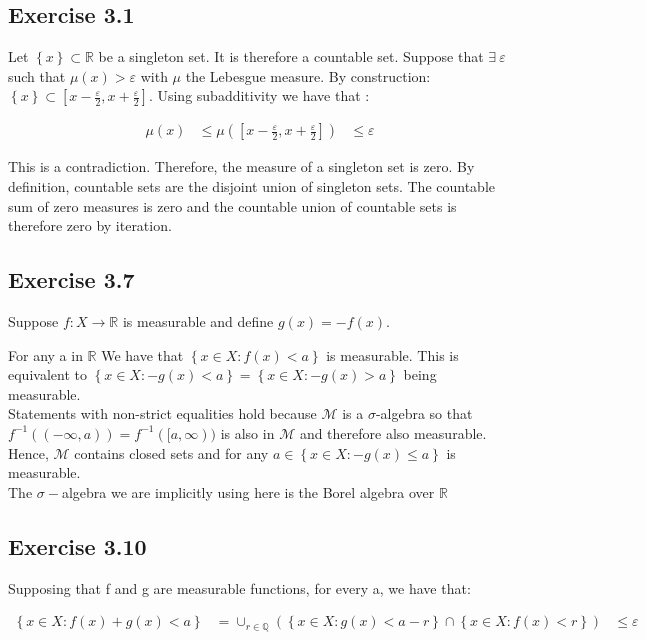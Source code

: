 \documentclass[11pt]{article}
\numberwithin{equation}{section}
\theoremstyle{plain}
\theoremstyle{definition}
\newcommand\parens[1]{\left( #1 \right)}
\newcommand\squares[1]{\left[ #1 \right]}
\newcommand\braces[1]{\left\{ #1 \right\}}
\def\ss{\subset}
\newcommand{\1}{\mathbbm 1}
\def\s{\sigma}
\newcommand{\e}{\varepsilon}
\newcommand{\RR}{\mathbb R}
\newcommand{\QQ}{\mathbb Q}
\newcommand{\mM}{\mathcal M}
\begin{document}
\subsection*{Exercise 3.1}
Let $\braces{x} \ss \RR$  be a singleton set. It is therefore a countable set. Suppose that $\exists \ \e$ such that $\mu (x) > \e $ with $\mu$ the Lebesgue measure. 
By construction:
$\braces{x} \ss \squares{x - \frac{\e}{2}, x + \frac{\e}{2}}$. Using subadditivity we have that :

\begin{align}
\mu (x) &\leq \mu \parens{\squares{x - \frac{\e}{2}, x + \frac{\e}{2}}}
		& \leq \e
\end{align}

This is a contradiction. Therefore, the measure of a singleton set is zero. By definition, countable sets are the disjoint union of singleton sets. The countable sum of zero measures is zero and the countable union of countable sets is therefore zero by iteration.  

\subsection*{Exercise 3.7}
Suppose $f: X \to \RR$ is measurable and define $g(x) = - f(x)$.

For any a in $\RR$ We have that $\braces{x \in X : f(x) <a}$ is measurable. This is equivalent to  $\braces{x \in X : -g(x) <a}= \braces{x \in X : -g(x) >a}$ being measurable. \\
Statements with non-strict equalities hold because $\mM$ is a $\s$-algebra so that $f^{-1} ((-\infty,a)) = f^{-1} ([a,\infty))$ is also in $\mM$ and therefore also measurable. Hence, $\mM$ contains closed sets and for any $a \in \braces{x \in X : -g(x) \leq a}$ is measurable. \\

The $\s-$algebra we are implicitly using here is the Borel algebra over $\RR$

\subsection*{Exercise 3.10}

Supposing that f and g are measurable functions, for every a, we have that: 

\begin{align}
\braces{ x \in X: f(x) + g(x) < a} &= \cup_{r \in \QQ} \parens{ \braces{x \in X: g(x) < a - r} \cap \braces{ x \in X: f(x) < r} }
		& \leq \e
\end{align}
\end{document}
